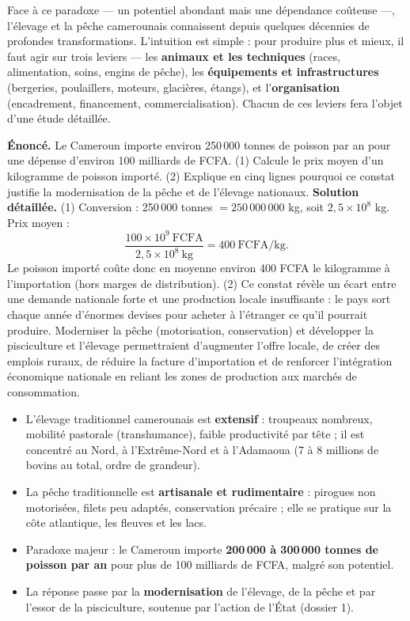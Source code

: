 \documentclass[11pt]{article}
\newcommand{\cle}[1]{{\popxbold\color{popdark}#1}}
\begin{document}
Face à ce paradoxe — un potentiel abondant mais une dépendance coûteuse —, l'élevage et la pêche camerounais connaissent depuis quelques décennies de profondes \cle{transformations}. L'intuition est simple : pour produire plus et mieux, il faut agir sur trois leviers — les \textbf{animaux et les techniques} (races, alimentation, soins, engins de pêche), les \textbf{équipements et infrastructures} (bergeries, poulaillers, moteurs, glacières, étangs), et l'\textbf{organisation} (encadrement, financement, commercialisation). Chacun de ces leviers fera l'objet d'une étude détaillée.

\begin{exoresolu}
\textbf{Énoncé.} Le Cameroun importe environ 250\,000 tonnes de poisson par an pour une dépense d'environ 100 milliards de FCFA. (1) Calcule le prix moyen d'un kilogramme de poisson importé. (2) Explique en cinq lignes pourquoi ce constat justifie la modernisation de la pêche et de l'élevage nationaux.
\tcblower
\textbf{Solution détaillée.}
(1) Conversion : 250\,000 tonnes $= 250\,000\,000$ kg, soit $2,5 \times 10^{8}$ kg. Prix moyen :
\[ \frac{100 \times 10^{9}\ \text{FCFA}}{2,5 \times 10^{8}\ \text{kg}} = 400\ \text{FCFA/kg}. \]
Le poisson importé coûte donc en moyenne environ 400 FCFA le kilogramme à l'importation (hors marges de distribution).
(2) Ce constat révèle un écart entre une demande nationale forte et une production locale insuffisante : le pays sort chaque année d'énormes devises pour acheter à l'étranger ce qu'il pourrait produire. Moderniser la pêche (motorisation, conservation) et développer la pisciculture et l'élevage permettraient d'augmenter l'offre locale, de créer des emplois ruraux, de réduire la facture d'importation et de renforcer l'intégration économique nationale en reliant les zones de production aux marchés de consommation.
\end{exoresolu}

\begin{aretenir}
\begin{itemize}
\item L'élevage traditionnel camerounais est \textbf{extensif} : troupeaux nombreux, mobilité pastorale (transhumance), faible productivité par tête ; il est concentré au Nord, à l'Extrême-Nord et à l'Adamaoua (7 à 8 millions de bovins au total, ordre de grandeur).
\item La pêche traditionnelle est \textbf{artisanale et rudimentaire} : pirogues non motorisées, filets peu adaptés, conservation précaire ; elle se pratique sur la côte atlantique, les fleuves et les lacs.
\item Paradoxe majeur : le Cameroun importe \textbf{200\,000 à 300\,000 tonnes de poisson par an} pour plus de 100 milliards de FCFA, malgré son potentiel.
\item La réponse passe par la \textbf{modernisation} de l'élevage, de la pêche et par l'essor de la pisciculture, soutenue par l'action de l'État (dossier 1).
\end{itemize}
\end{aretenir}
\end{document}
